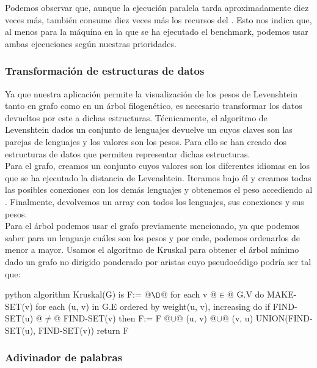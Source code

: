 Podemos observar que, aunque la ejecución paralela tarda aproximadamente diez veces más, también consume diez veces más los recursos del . Esto nos indica que, al menos para la máquina en la que se ha ejecutado el benchmark, podemos usar ambas ejecuciones según nuestras prioridades.

\subsubsection{Transformación de estructuras de datos}
Ya que nuestra aplicación permite la visualización de los pesos de Levenshtein tanto en grafo como en un árbol filogenético\cite{Phylogenetic tree}, es necesario transformar los datos devueltos por este a dichas estructuras. Técnicamente, el algoritmo de Levenshtein dados un conjunto de lenguajes devuelve un  cuyos claves son las parejas de lenguajes y los valores son los pesos. Para ello se han creado dos estructuras de datos que permiten representar dichas estructuras.\\

Para el grafo, creamos un conjunto cuyos valores son los diferentes idiomas en los que se ha ejecutado la distancia de Levenshtein. Iteramos bajo él y creamos todas las posibles conexiones con los demás lenguajes y obtenemos el peso accediendo al . Finalmente, devolvemos un array con todos los lenguajes, sus conexiones y sus pesos.\\

Para el árbol podemos usar el grafo previamente mencionado, ya que podemos saber para un lenguaje cuáles son los pesos y por ende, podemos ordenarlos de menor a mayor. Usamos el algoritmo de Kruskal\cite{Kruskal algorithm} para obtener el árbol mínimo dado un grafo no dirigido ponderado por aristas cuyo pseudocódigo podría ser tal que:

\begin{code}{\scriptsize}{python}
algorithm Kruskal(G) is
    F:= @$\O$@
    for each v @$\in$@ G.V do
        MAKE-SET(v)
    for each (u, v) in G.E ordered by weight(u, v), increasing do
        if FIND-SET(u) @$\neq$@ FIND-SET(v) then
            F:= F @$\cup$@ {(u, v)} @$\cup$@ {(v, u)}
            UNION(FIND-SET(u), FIND-SET(v))
    return F
\end{code}

\subsubsection{Adivinador de palabras}\label{Word Guesser expl}

